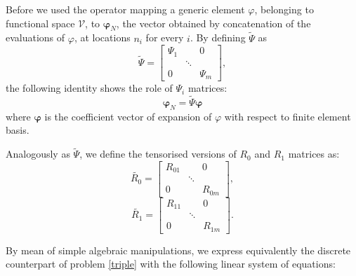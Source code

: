 Before we used the operator mapping a generic element $\varphi$, belonging to
functional space $\mathcal{V}$, to $\bm{\varphi}_N$, the vector obtained by
concatenation of the evaluations of $\varphi$, at locations $n_i$ for every
$i$. By defining $\tilde{\Psi}$ as
\begin{equation}
	\tilde{\Psi}=
	\begin{bmatrix}
		\Psi_1 &        & 0      \\
		       & \ddots &        \\
		0      &        & \Psi_m
	\end{bmatrix}
	,
\end{equation}
the following identity shows the role of $\Psi_i$ matrices:
\begin{equation}
	\bm{\varphi}_N=\tilde{\Psi}\bm{\varphi}
\end{equation}
where $\bm{\varphi}$ is the coefficient vector of expansion of
$\varphi$ with respect to finite element basis.

Analogously as $\tilde{\Psi}$, we define the tensorised versions of $R_0$ and
$R_1$ matrices as:
\begin{equation}
	\tilde{R_0}=
	\begin{bmatrix}
		R_{01} &        & 0      \\
		       & \ddots &        \\
		0      &        & R_{0m}
	\end{bmatrix}
	,
\end{equation}
\begin{equation}
	\tilde{R_1}=
	\begin{bmatrix}
		R_{11} &        & 0      \\
		       & \ddots &        \\
		0      &        & R_{1m}
	\end{bmatrix}
	.
\end{equation}

By mean of simple algebraic manipulations, we express equivalently the discrete
counterpart of problem \ref{triple} with the following linear system of
equations:

